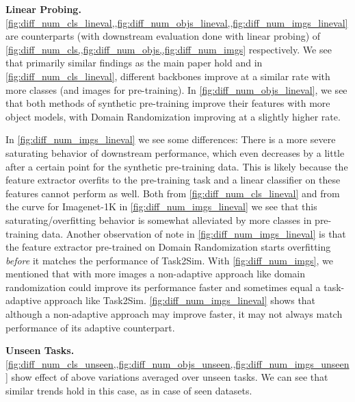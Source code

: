 

\noindent \textbf{Linear Probing.} \cref{fig:diff_num_cls_lineval,,fig:diff_num_objs_lineval,,fig:diff_num_imgs_lineval} are counterparts (with downstream evaluation done with linear probing) of \cref{fig:diff_num_cls,,fig:diff_num_objs,,fig:diff_num_imgs} respectively. We see that primarily similar findings as the main paper hold and in \cref{fig:diff_num_cls_lineval}, different backbones improve at a similar rate with more classes (and images for pre-training). In \cref{fig:diff_num_objs_lineval}, we see that both methods of synthetic pre-training improve their features with more object models, with Domain Randomization improving at a slightly higher rate. 

In \cref{fig:diff_num_imgs_lineval} we see some differences: There is a more severe saturating behavior of downstream performance, which even decreases by a little after a certain point for the synthetic pre-training data. This is likely because the feature extractor overfits to the pre-training task and a linear classifier on these features cannot perform as well. Both from \cref{fig:diff_num_cls_lineval} and from the curve for Imagenet-1K in \cref{fig:diff_num_imgs_lineval} we see that this saturating/overfitting behavior is somewhat alleviated by more classes in pre-training data. Another observation of note in \cref{fig:diff_num_imgs_lineval} is that the feature extractor pre-trained on Domain Randomization starts overfitting \emph{before} it matches the performance of Task2Sim. 
With \cref{fig:diff_num_imgs}, we mentioned that with more images a non-adaptive approach like domain randomization could improve its performance faster and sometimes equal a task-adaptive approach like Task2Sim. \cref{fig:diff_num_imgs_lineval} shows that although a non-adaptive approach may improve faster, it may not always match performance of its adaptive counterpart.

\vspace{1mm}
\noindent \textbf{Unseen Tasks.} \cref{fig:diff_num_cls_unseen,,fig:diff_num_objs_unseen,,fig:diff_num_imgs_unseen} show effect of above variations averaged over unseen tasks. We can see that similar trends hold in this case, as in case of seen datasets.


